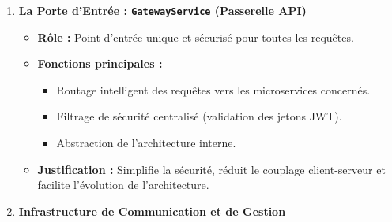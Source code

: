 \begin{enumerate}[label=\textbf{\alph*.}]
    \item \textbf{La Porte d'Entrée : \texttt{GatewayService} (Passerelle API)} 
    
    \begin{itemize}[label=\textbullet]
        \item \textbf{Rôle :} Point d'entrée unique et sécurisé pour toutes les requêtes. 
        \item \textbf{Fonctions principales :}
        \begin{itemize}[label=$\triangleright$]
            \item Routage intelligent des requêtes vers les microservices concernés.
            \item Filtrage de sécurité centralisé (validation des jetons JWT).
            \item Abstraction de l'architecture interne.
        \end{itemize}
        \item \textbf{Justification :} Simplifie la sécurité, réduit le couplage client-serveur et facilite l'évolution de l'architecture.
    \end{itemize}

    \item \textbf{Infrastructure de Communication et de Gestion}


\end{enumerate}
